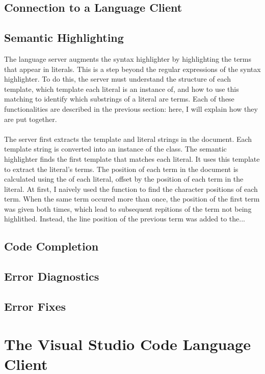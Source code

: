 \documentclass[../main.tex]{subfiles}
\begin{document}
\subsection{Connection to a Language Client}


\subsection{Semantic Highlighting}
The language server augments the syntax highlighter by highlighting the terms that appear in literals. This is a step beyond the regular expressions of the syntax highlighter. To do this, the server must understand the structure of each template, which template each literal is an instance of, and how to use this matching to identify which substrings of a literal are terms. Each of these functionalities are described in the previous section: here, I will explain how they are put together.
\\ 
\\
The server first extracts the template and literal strings in the document. Each template string is converted into an instance of the  class.
The semantic highlighter finds the first template that matches each literal. 
 It uses this template to extract the literal's terms. The position of each term in the document is calculated using the  of each literal, offset by the position of each term in the literal. At first, I naively used the  function to find the character positions of each term. When the same term occured more than once, the position of the first term was given both times, which lead to subsequent repitions of the term not being highlithed. Instead, the line position of the previous term was added to the...


\subsection{Code Completion}


\subsection{Error Diagnostics}

\subsection{Error Fixes}

\section{The Visual Studio Code Language Client}
\end{document}
